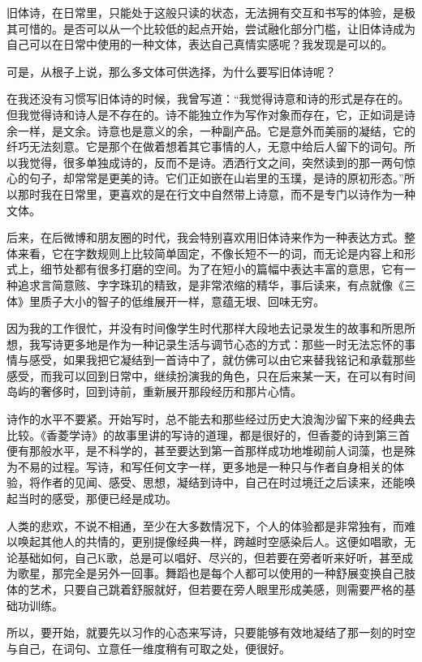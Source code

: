 \documentclass{article}
\begin{document}
旧体诗，在日常里，只能处于这般只读的状态，无法拥有交互和书写的体验，是极其可惜的。是否可以从一个比较低的起点开始，尝试融化部分门槛，让旧体诗成为自己可以在日常中使用的一种文体，表达自己真情实感呢？我发现是可以的。

可是，从根子上说，那么多文体可供选择，为什么要写旧体诗呢？

在我还没有习惯写旧体诗的时候，我曾写道：``我觉得诗意和诗的形式是存在的。但我觉得诗和诗人是不存在的。诗不能独立作为写作对象而存在，它，正如词是诗余一样，是文余。诗意也是意义的余，一种副产品。它是意外而美丽的凝结，它的纤巧无法刻意。它是那个在做着想着其它事情的人，无意中给后人留下的词句。所以我觉得，很多单独成诗的，反而不是诗。洒洒行文之间，突然读到的那一两句惊心的句子，却常常是更美的诗。它们正如嵌在山岩里的玉璞，是诗的原初形态。''所以那时我在日常里，更喜欢的是在行文中自然带上诗意，而不是专门以诗作为一种文体。

后来，在后微博和朋友圈的时代，我会特别喜欢用旧体诗来作为一种表达方式。整体来看，它在字数规则上比较简单固定，不像长短不一的词，而无论是内容上和形式上，细节处都有很多打磨的空间。为了在短小的篇幅中表达丰富的意思，它有一种追求言简意赅、字字珠玑的精致，是非常浓缩的精华，事后读来，有点就像《三体》里质子大小的智子的低维展开一样，意蕴无垠、回味无穷。

因为我的工作很忙，并没有时间像学生时代那样大段地去记录发生的故事和所思所想，我写诗更多地是作为一种记录生活与调节心态的方式：那些一时无法忘怀的事情与感受，如果我把它凝结到一首诗中了，就仿佛可以由它来替我铭记和承载那些感受，而我可以回到日常中，继续扮演我的角色，只在后来某一天，在可以有时间岛屿的奢侈时，回到诗前，重新展开那段经历和那片心情。

诗作的水平不要紧。开始写时，总不能去和那些经过历史大浪淘沙留下来的经典去比较。《香菱学诗》的故事里讲的写诗的道理，都是很好的，但香菱的诗到第三首便有那般水平，是不科学的，甚至要达到第一首那样成功地堆砌前人词藻，也是殊为不易的过程。写诗，和写任何文字一样，更多地是一种只与作者自身相关的体验，将作者的见闻、感受、思想，凝结到诗中，自己在时过境迁之后读来，还能唤起当时的感受，那便已经是成功。

人类的悲欢，不说不相通，至少在大多数情况下，个人的体验都是非常独有，而难以唤起其他人的共情的，更别提像经典一样，跨越时空感染后人。这便如唱歌，无论基础如何，自己K歌，总是可以唱好、尽兴的，但若要在旁者听来好听，甚至成为歌星，那完全是另外一回事。舞蹈也是每个人都可以使用的一种舒展变换自己肢体的艺术，只要自己跳着舒服就好，但若要在旁人眼里形成美感，则需要严格的基础功训练。

所以，要开始，就要先以习作的心态来写诗，只要能够有效地凝结了那一刻的时空与自己，在词句、立意任一维度稍有可取之处，便很好。
\end{document}
